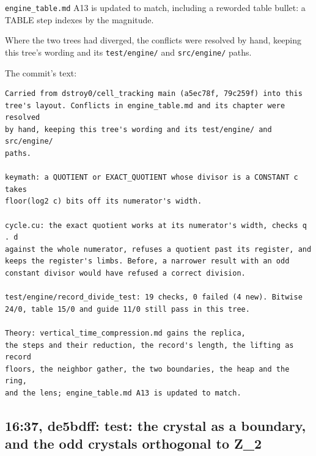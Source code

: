 \texttt{engine\_\allowbreak{}table.\allowbreak{}md} A13 is updated to match, including a reworded table bullet: a TABLE step indexes by the magnitude.

Where the two trees had diverged, the conflicts were resolved by hand, keeping this tree's wording and its \texttt{test/\allowbreak{}engine/\allowbreak{}} and \texttt{src/\allowbreak{}engine/\allowbreak{}} paths.

The commit's text:

\begin{Verbatim}
Carried from dstroy0/cell_tracking main (a5ec78f, 79c259f) into this
tree's layout. Conflicts in engine_table.md and its chapter were resolved
by hand, keeping this tree's wording and its test/engine/ and src/engine/
paths.

keymath: a QUOTIENT or EXACT_QUOTIENT whose divisor is a CONSTANT c takes
floor(log2 c) bits off its numerator's width.

cycle.cu: the exact quotient works at its numerator's width, checks q . d
against the whole numerator, refuses a quotient past its register, and
keeps the register's limbs. Before, a narrower result with an odd
constant divisor would have refused a correct division.

test/engine/record_divide_test: 19 checks, 0 failed (4 new). Bitwise
24/0, table 15/0 and guide 11/0 still pass in this tree.

Theory: vertical_time_compression.md gains the replica,
the steps and their reduction, the record's length, the lifting as record
floors, the neighbor gather, the two boundaries, the heap and the ring,
and the lens; engine_table.md A13 is updated to match.
\end{Verbatim}

\subsection{\texorpdfstring{16:37, de5bdff: test: the crystal as a boundary, and the odd crystals orthogonal to Z\_\allowbreak{}2}{16:37, de5bdff: test: the crystal as a boundary, and the odd crystals orthogonal to Z\_2}}

